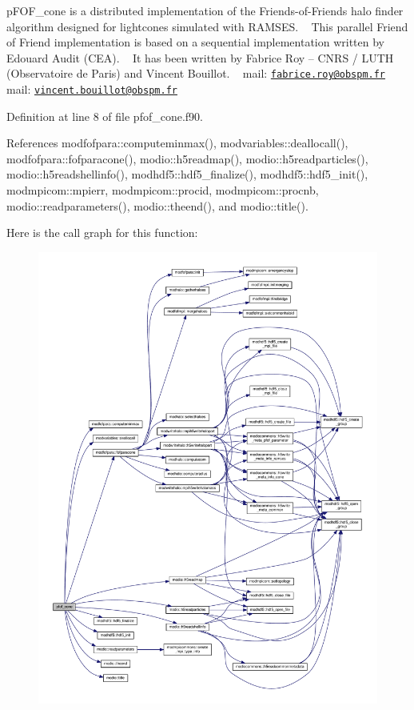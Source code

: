 p\+F\+O\+F\+\_\+cone is a distributed implementation of the Friends-\/of-\/\+Friends halo finder algorithm designed for lightcones simulated with R\+A\+M\+S\+ES. ~\newline
 This parallel Friend of Friend implementation is based on a sequential implementation written by Edouard Audit (C\+EA). ~\newline
 It has been written by Fabrice Roy -- C\+N\+RS / L\+U\+TH (Observatoire de Paris) and Vincent Bouillot. ~\newline
 mail\+: \href{mailto:fabrice.roy@obspm.fr}{\tt fabrice.\+roy@obspm.\+fr} ~\newline
 mail\+: \href{mailto:vincent.bouillot@obspm.fr}{\tt vincent.\+bouillot@obspm.\+fr} ~\newline
 



Definition at line 8 of file pfof\+\_\+cone.\+f90.



References modfofpara\+::computeminmax(), modvariables\+::deallocall(), modfofpara\+::fofparacone(), modio\+::h5readmap(), modio\+::h5readparticles(), modio\+::h5readshellinfo(), modhdf5\+::hdf5\+\_\+finalize(), modhdf5\+::hdf5\+\_\+init(), modmpicom\+::mpierr, modmpicom\+::procid, modmpicom\+::procnb, modio\+::readparameters(), modio\+::theend(), and modio\+::title().



Here is the call graph for this function\+:\nopagebreak
\begin{figure}[H]
\begin{center}
\leavevmode
\includegraphics[width=350pt]{pfof__cone_8f90_addc770475dc2e497bf70a10ebc158aed_cgraph}
\end{center}
\end{figure}


